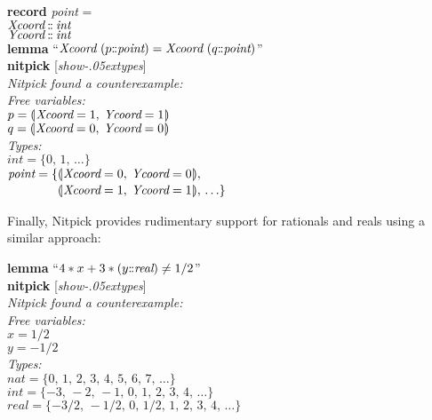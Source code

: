 \documentclass[a4paper,12pt]{article}
\def\Colon{\mathord{:\mkern-1.5mu:}}
\def\lparr{\mathopen{(\mkern-4mu\mid}}
\def\rparr{\mathclose{\mid\mkern-4mu)}}
\def\unr{\ldots}
\renewcommand\_{\hbox{\textunderscore\kern-.05ex}}
\begin{document}
\prew
\textbf{record} \textit{point} = \\
\hbox{}\quad $\textit{Xcoord} \mathbin{\Colon} \textit{int}$ \\
\hbox{}\quad $\textit{Ycoord} \mathbin{\Colon} \textit{int}$ \\[2\smallskipamount]
\textbf{lemma} ``$\textit{Xcoord}~(p\Colon\textit{point}) = \textit{Xcoord}~(q\Colon\textit{point})$'' \\
\textbf{nitpick} [\textit{show\_types}] \\[2\smallskipamount]
\slshape Nitpick found a counterexample: \\[2\smallskipamount]
\hbox{}\qquad Free variables: \nopagebreak \\
\hbox{}\qquad\qquad $p = \lparr\textit{Xcoord} = 1,\> \textit{Ycoord} = 1\rparr$ \\
\hbox{}\qquad\qquad $q = \lparr\textit{Xcoord} = 0,\> \textit{Ycoord} = 0\rparr$ \\
\hbox{}\qquad Types: \\
\hbox{}\qquad\qquad $\textit{int} = \{0,\, 1,\, \unr\}$ \\
\hbox{}\qquad\qquad $\textit{point} = \{\!\begin{aligned}[t]
& \lparr\textit{Xcoord} = 0,\> \textit{Ycoord} = 0\rparr, \\[-2pt] %
& \lparr\textit{Xcoord} = 1,\> \textit{Ycoord} = 1\rparr,\, \unr\}\end{aligned}$
\postw

Finally, Nitpick provides rudimentary support for rationals and reals using a
similar approach:

\prew
\textbf{lemma} ``$4 * x + 3 * (y\Colon\textit{real}) \not= 1/2$'' \\
\textbf{nitpick} [\textit{show\_types}] \\[2\smallskipamount]
\slshape Nitpick found a counterexample: \\[2\smallskipamount]
\hbox{}\qquad Free variables: \nopagebreak \\
\hbox{}\qquad\qquad $x = 1/2$ \\
\hbox{}\qquad\qquad $y = -1/2$ \\
\hbox{}\qquad Types: \\
\hbox{}\qquad\qquad $\textit{nat} = \{0,\, 1,\, 2,\, 3,\, 4,\, 5,\, 6,\, 7,\, \unr\}$ \\
\hbox{}\qquad\qquad $\textit{int} = \{-3,\, -2,\, -1,\, 0,\, 1,\, 2,\, 3,\, 4,\, \unr\}$ \\
\hbox{}\qquad\qquad $\textit{real} = \{-3/2,\, -1/2,\, 0,\, 1/2,\, 1,\, 2,\, 3,\, 4,\, \unr\}$
\postw
\end{document}
